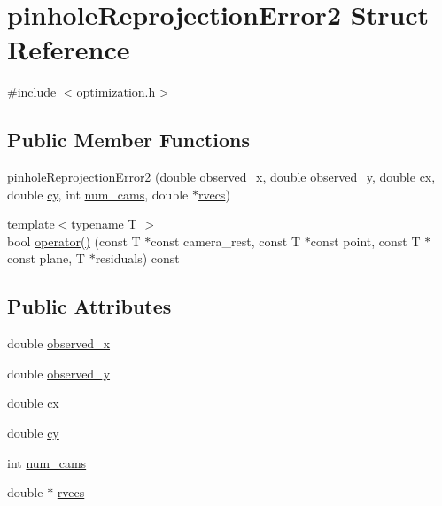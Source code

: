 \hypertarget{structpinholeReprojectionError2}{\section{pinhole\-Reprojection\-Error2 Struct Reference}
\label{d7/d56/structpinholeReprojectionError2}
}


{\ttfamily \#include $<$optimization.\-h$>$}

\subsection*{Public Member Functions}
\begin{DoxyCompactItemize}
\item 
\hyperlink{structpinholeReprojectionError2_ae493e3f3b52f9d7ead17ad02d9e7f978}{pinhole\-Reprojection\-Error2} (double \hyperlink{structpinholeReprojectionError2_a2df19a011cb82a6830dabf285dfe6901}{observed\-\_\-x}, double \hyperlink{structpinholeReprojectionError2_a93f2d305e8efff21397d6103439721b1}{observed\-\_\-y}, double \hyperlink{structpinholeReprojectionError2_a17a9f0aab1e55be49914798a84a305b0}{cx}, double \hyperlink{structpinholeReprojectionError2_ab88a90cf6bfe93e62ff114aa44c9e1d2}{cy}, int \hyperlink{structpinholeReprojectionError2_aece1e599eed8dda29df1ddf16d243cba}{num\-\_\-cams}, double $\ast$\hyperlink{structpinholeReprojectionError2_af1afb81c570c7bf8d497a8ecf1cc7e69}{rvecs})
\item 
{\footnotesize template$<$typename T $>$ }\\bool \hyperlink{structpinholeReprojectionError2_abfaeba9b350a1b701dcadf5c9603085d}{operator()} (const T $\ast$const camera\-\_\-rest, const T $\ast$const point, const T $\ast$const plane, T $\ast$residuals) const 
\end{DoxyCompactItemize}
\subsection*{Public Attributes}
\begin{DoxyCompactItemize}
\item 
double \hyperlink{structpinholeReprojectionError2_a2df19a011cb82a6830dabf285dfe6901}{observed\-\_\-x}
\item 
double \hyperlink{structpinholeReprojectionError2_a93f2d305e8efff21397d6103439721b1}{observed\-\_\-y}
\item 
double \hyperlink{structpinholeReprojectionError2_a17a9f0aab1e55be49914798a84a305b0}{cx}
\item 
double \hyperlink{structpinholeReprojectionError2_ab88a90cf6bfe93e62ff114aa44c9e1d2}{cy}
\item 
int \hyperlink{structpinholeReprojectionError2_aece1e599eed8dda29df1ddf16d243cba}{num\-\_\-cams}
\item 
double $\ast$ \hyperlink{structpinholeReprojectionError2_af1afb81c570c7bf8d497a8ecf1cc7e69}{rvecs}
\end{DoxyCompactItemize}


